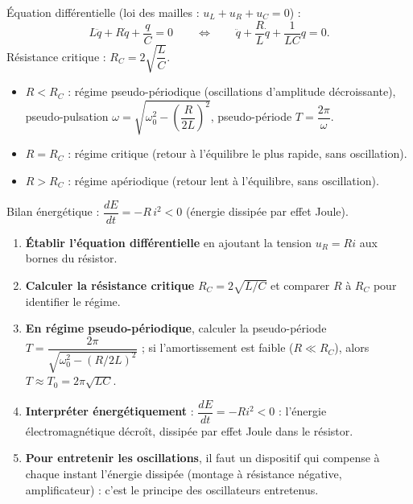 \documentclass[11pt]{article}
\newcommand{\cle}[1]{{\popxbold\color{popdark}#1}}
\begin{document}
\begin{aretenir}
Équation différentielle (loi des mailles : $u_L + u_R + u_C = 0$) :
\[ L\ddot{q} + R\dot{q} + \frac{q}{C} = 0 \qquad \Longleftrightarrow \qquad \ddot{q} + \frac{R}{L}\dot{q} + \frac{1}{LC}q = 0. \]
Résistance critique : $R_C = 2\sqrt{\dfrac{L}{C}}$.
\begin{itemize}
\item $R < R_C$ : régime \cle{pseudo-périodique} (oscillations d'amplitude décroissante), pseudo-pulsation $\omega = \sqrt{\omega_0^2 - \left(\dfrac{R}{2L}\right)^2}$, pseudo-période $T = \dfrac{2\pi}{\omega}$.
\item $R = R_C$ : régime \cle{critique} (retour à l'équilibre le plus rapide, sans oscillation).
\item $R > R_C$ : régime \cle{apériodique} (retour lent à l'équilibre, sans oscillation).
\end{itemize}
Bilan énergétique : $\dfrac{dE}{dt} = -R\,i^2 < 0$ (énergie dissipée par effet Joule).
\end{aretenir}

\begin{methode}
\begin{enumerate}
\item \textbf{Établir l'équation différentielle} en ajoutant la tension $u_R = Ri$ aux bornes du résistor.
\item \textbf{Calculer la résistance critique} $R_C = 2\sqrt{L/C}$ et comparer $R$ à $R_C$ pour identifier le régime.
\item \textbf{En régime pseudo-périodique}, calculer la pseudo-période $T = \dfrac{2\pi}{\sqrt{\omega_0^2 - (R/2L)^2}}$ ; si l'amortissement est faible ($R \ll R_C$), alors $T \approx T_0 = 2\pi\sqrt{LC}$.
\item \textbf{Interpréter énergétiquement} : $\dfrac{dE}{dt} = -Ri^2 < 0$ : l'énergie électromagnétique décroît, dissipée par effet Joule dans le résistor.
\item \textbf{Pour entretenir les oscillations}, il faut un dispositif qui compense à chaque instant l'énergie dissipée (montage à résistance négative, amplificateur) : c'est le principe des oscillateurs entretenus.
\end{enumerate}
\end{methode}
\end{document}
